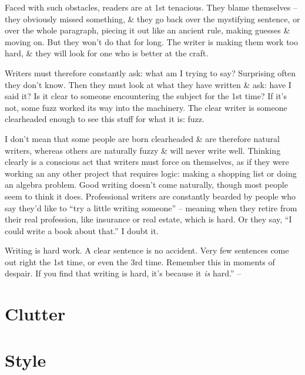 \documentclass{article}
\begin{document}
Faced with such obstacles, readers are at 1st tenacious. They blame themselves -- they obviously missed something, \& they go back over the mystifying sentence, or over the whole paragraph, piecing it out like an ancient rule, making guesses \& moving on. But they won't do that for long. The writer is making them work too hard, \& they will look for one who is better at the craft.

Writers must therefore constantly ask: what am I trying to say? Surprising often they don't know. Then they must look at what they have written \& ask: have I said it? Is it clear to someone encountering the subject for the 1st time? If it's not, some fuzz worked its way into the machinery. The clear writer is someone clearheaded enough to see this stuff for what it is: fuzz.

I don't mean that some people are born clearheaded \& are therefore natural writers, whereas others are naturally fuzzy \& will never write well. Thinking clearly is a conscious act that writers must force on themselves, as if they were working an any other project that requires logic: making a shopping list or doing an algebra problem. Good writing doesn't come naturally, though most people seem to think it does. Professional writers are constantly bearded by people who say they'd like to ``try a little writing someone'' -- meaning when they retire from their real profession, like insurance or real estate, which is hard. Or they say, ``I could write a book about that.'' I doubt it.

Writing is hard work. A clear sentence is no accident. Very few sentences come out right the 1st time, or even the 3rd time. Remember this in moments of despair. If you find that writing is hard, it's because it \textit{is} hard.'' -- \cite[pp. 15--17]{Zinsser2016}


\section{Clutter}


\section{Style}

\end{document}
